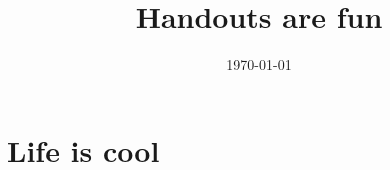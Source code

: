 \documentclass[handout]{tufte-handout}
\title{Handouts are fun}
\date{\today}
\author{\mobeardInstructorShort}
\begin{document}
\maketitle
\section{Life is cool}
\end{document}
